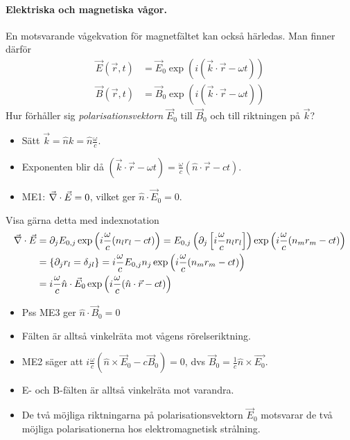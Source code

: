\documentclass[%
oneside,                 %
final,                   %
10pt]{article}
\begin{document}
\paragraph{Elektriska och magnetiska vågor.}
En motsvarande vågekvation för magnetfältet kan också härledas. Man finner därför
\begin{align}
\vec{E}(\vec{r},t) &= \vec{E}_0 \exp\left( i (\vec{k} \cdot \vec{r} - \omega t ) \right)  \nonumber \\
\vec{B}(\vec{r},t) &= \vec{B}_0 \exp\left( i (\vec{k} \cdot \vec{r} - \omega t ) \right)  \nonumber 
\end{align}
Hur förhåller sig \emph{polarisationsvektorn} $\vec{E}_0$ till $\vec{B}_0$ och till riktningen på $\vec{k}$?
\begin{itemize}
\item Sätt $\vec{k} = \hat{n} k = \hat{n} \frac{\omega}{c}$.

\item Exponenten blir då $(\vec{k} \cdot \vec{r} - \omega t ) = \frac{\omega}{c}(\hat{n} \cdot \vec{r} - c t )$.

\item ME1: $\vec{\nabla} \cdot \vec{E} = 0$, vilket ger $\hat{n} \cdot \vec{E}_0 = 0$.
\end{itemize}

\noindent
Visa gärna detta med indexnotation
\begin{align}
\vec{\nabla} \cdot \vec{E} &= \partial_j E_{0,j} \exp \left( i \frac{\omega}{c} (n_l r_l - ct) \right) = E_{0,j} \left( \partial_j \left[i \frac{\omega}{c} n_l r_l \right] \right) \exp \left( i \frac{\omega}{c} (n_m r_m - ct) \right) \nonumber \\
&= \left\{ \partial_j r_l = \delta_{jl} \right\} = i \frac{\omega}{c} E_{0,j} n_j \exp \left( i \frac{\omega}{c} (n_m r_m - ct) \right) \nonumber \\
&= i \frac{\omega}{c} \hat{n} \cdot \vec{E}_0 \exp \left( i \frac{\omega}{c} (\hat{n} \cdot \vec{r} - ct) \right) \nonumber
\end{align}
\begin{itemize}
\item Pss ME3 ger $\hat{n} \cdot \vec{B}_0 = 0$

\item Fälten är alltså vinkelräta mot vågens rörelseriktning.

\item ME2 säger att $i \frac{\omega}{c} (\hat{n} \times \vec{E}_0 - c \vec{B}_0) = 0$, dvs $\vec{B}_0 = \frac{1}{c} \hat{n} \times \vec{E_0}$.

\item E- och B-fälten är alltså vinkelräta mot varandra. 

\item De två möjliga riktningarna på polarisationsvektorn $\vec{E}_0$ motsvarar de två möjliga polarisationerna hos elektromagnetisk strålning.
\end{itemize}
\end{document}
